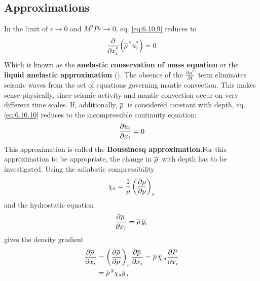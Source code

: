 \documentclass[document.tex]{subfiles}
\begin{document}
\subsection{Approximations}
In the limit of $\epsilon \to 0$ and $M^2Pr \to 0$, eq. \ref{eq:6.10.9} reduces to 
\begin{equation}
    \label{eq:6.10.10}
    \pdv{\ensuremath x_i^{\textup{*}}}(\overline{\rho}\,^{\textup{*}} u_i^{\textup{*}}) = 0
\end{equation}
Which is known as the \textbf{anelastic conservation of mass equation} or the \textbf{liquid anelastic 
approximation} (\cite{jamc80}).
The absence of the $\pdv{\rho'}{t}$ term eliminates seismic waves from the set of equations 
governing mantle convection. This makes sense physically, since seismic activity and 
mantle convection occur on very different time scales. 
If, additionally, $\overline{\rho}\,$ is considered constant with depth, eq. \ref{eq:6.10.10} reduces to the incompressible 
continuity equation: 
\begin{equation}
    \label{eq:incompressible continuity}
    \pdv{u_i}{x_i} = 0 
\end{equation} 
This approximation is called the \textbf{Boussinesq approximation}.For this approximation to be appropriate, the change in $\overline{\rho}\,$ with depth
has to be investigated. Using the adiabatic compressibility
\begin{equation}
    \chi_a = \frac{1}{\rho} \left(\pdv{\rho}{p}\right)_s
\end{equation}
and the hydrostatic equation 
\begin{equation}
    \pdv{\overline{\rho}\,}{x_i} = \overline{\rho}\,\overline{g_i}\,
\end{equation}
gives the density gradient 
\begin{align}
    \begin{split}
        \pdv{\overline{\rho}\,}{x_i} &= \left(\pdv{\overline{\rho}\,}{\overline{p}\,}\right)_s 
        \pdv{\overline{p}\,}{x_i} = \overline{\rho}\,\overline{\chi}\,_a \pdv{P}{x_i} \\
    &= \overline{\rho}\,^2\chi_a\overline{g}\,_i
    \end{split}
\end{align}
\end{document}
